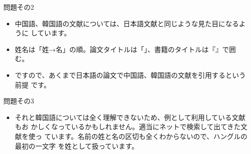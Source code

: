 \documentclass[article]{jlreq}
\begin{document}
問題その2
\begin{itemize}
 \item 中国語、韓国語の文献については、日本語文献と同じような見た目になるように
       しています。
 \item 姓名は「姓→名」の順。論文タイトルは「」、書籍のタイトルは『』で囲む。
 \item ですので、あくまで日本語の論文で中国語、韓国語の文献を引用するという前提
       です。
\end{itemize}

問題その3
\begin{itemize}
 \item それと韓国語については全く理解できないため、例として利用している文献もお
       かしくなっているかもしれません。適当にネットで検索して出てきた文献を使っ
       ています。名前の姓と名の区切も全くわからないので、ハングルの最初の一文字
       を姓として扱っています。
\end{itemize}



\vspace{1em}


% 

\nocite{*}



%
% 

\end{document}
